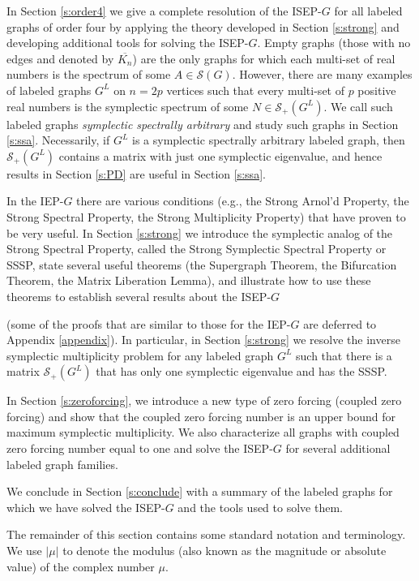 \documentclass[12pt]{article}
\theoremstyle{definition}
\theoremstyle{definition}
\theoremstyle{definition}
\numberwithin{figure}{section}
\numberwithin{equation}{section}
\newcommand{\symp}{\mathcal{S}_+}
\newcommand{\SG}{\mathcal{S}(G)}
\newcommand{\ms}{\medskip}
\newcommand{\OL}{\overline}
\begin{document}
In Section \ref{s:order4} we give a complete resolution of the ISEP-$G$ for all labeled graphs of order four by applying the
theory developed in Section \ref{s:strong}
 and developing additional tools for solving the ISEP-$G$.  
Empty graphs (those with no edges and denoted by $\OL{K_n}$)
are the only graphs for which each multi-set of real numbers is the spectrum of some $ A \in \SG $.
 However, there are many examples of labeled graphs $G^L$ on $n=2p$ vertices such that 
every multi-set of $p$ positive real numbers is the symplectic spectrum of some $N\in\symp(G^L)$. 
We call such  
labeled graphs \textit{symplectic spectrally arbitrary} and study such  graphs in Section \ref{s:ssa}.  Necessarily, if $G^L$ is a  symplectic spectrally arbitrary labeled graph, then  $\symp(G^L)$ contains a matrix with just one symplectic eigenvalue, and hence results in  Section \ref{s:PD} are useful in Section \ref{s:ssa}. 


In the IEP-$G$ there are various conditions (e.g., the Strong Arnol'd Property, the Strong Spectral Property, 
the Strong Multiplicity Property) that have proven to be very useful.  In Section \ref{s:strong} we introduce 
the symplectic analog of the Strong Spectral Property, called the Strong Symplectic Spectral Property or SSSP, state several useful theorems (the Supergraph Theorem, the Bifurcation Theorem, the Matrix Liberation Lemma), and  illustrate how to use these theorems
to establish several results about the ISEP-$G$ { (some of the proofs that are similar to those for the IEP-$G$ are deferred to Appendix \ref{appendix}). In particular, in Section \ref{s:strong} we resolve the  inverse symplectic multiplicity problem  for any labeled graph  $G^L$ such that there is a matrix $\symp(G^L)$ that has only one symplectic eigenvalue and  has the SSSP. 

In Section \ref{s:zeroforcing}, we introduce a new type of zero forcing (coupled zero forcing) and show that  the coupled zero forcing number is an upper bound for maximum symplectic multiplicity.  We also characterize all graphs with coupled zero forcing number equal to one and solve the ISEP-$G$ for several additional labeled graph families.} 
We conclude in Section \ref{s:conclude} with a summary of the labeled graphs for which we have solved the ISEP-$G$ and the tools used to solve them. 
 
 

\ms



The remainder of this section contains some standard notation and terminology. We use $|\mu|$  to denote the modulus (also known as the magnitude or absolute value) of the complex number $\mu$. 
\end{document}
